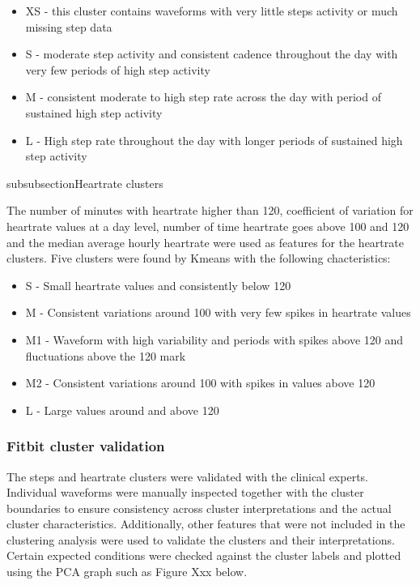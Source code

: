 \documentclass{article}
\begin{document}
\begin{itemize}
\item XS - this cluster contains waveforms with very little steps activity or much missing step data 
\item S - moderate step activity and consistent cadence throughout the day with very few periods of high step activity 
\item M - consistent moderate to high step rate across the day with period of sustained high step activity  
\item L - High step rate throughout the day with longer periods of sustained high step activity
\end{itemize}

subsubsection{Heartrate clusters}

The number of minutes with heartrate higher than 120, coefficient of variation for heartrate values at a day level, number of time heartrate goes above 100 and 120 and the median average hourly heartrate were used as features for the heartrate clusters. Five clusters were found by Kmeans with the following chacteristics: 
\begin{itemize}
\item S - Small heartrate values and consistently below 120 
\item M - Consistent variations around 100 with very few spikes in heartrate values 
\item M1 - Waveform with high variability and periods with spikes above 120 and fluctuations above the 120 mark 
\item M2 - Consistent variations around 100 with spikes in values above 120 
\item L - Large values around and above 120 
\end{itemize}


\subsubsection{Fitbit cluster validation }

The steps and heartrate clusters were validated with the clinical experts. Individual waveforms were manually inspected together with the cluster boundaries to ensure consistency across cluster interpretations and the actual cluster characteristics. Additionally, other features that were not included in the clustering analysis were used to validate the clusters and their interpretations. Certain expected conditions were checked against the cluster labels and plotted using the PCA graph such as Figure Xxx below. 
\end{document}
